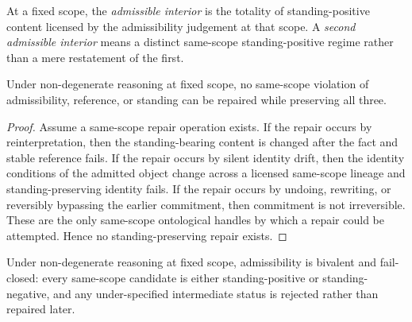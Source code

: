 \begin{definition}\label{def:admissible-interior}
At a fixed scope, the \emph{admissible interior} is the totality of standing-positive content licensed by the admissibility judgement at that scope. A \emph{second admissible interior} means a distinct same-scope standing-positive regime rather than a mere restatement of the first.
\end{definition}

\begin{lemma}\label{lem:no-standing-preserving-repair}
Under non-degenerate reasoning at fixed scope, no same-scope violation of admissibility, reference, or standing can be repaired while preserving all three.
\end{lemma}

\begin{proof}
Assume a same-scope repair operation exists. If the repair occurs by reinterpretation, then the standing-bearing content is changed after the fact and stable reference fails. If the repair occurs by silent identity drift, then the identity conditions of the admitted object change across a licensed same-scope lineage and standing-preserving identity fails. If the repair occurs by undoing, rewriting, or reversibly bypassing the earlier commitment, then commitment is not irreversible. These are the only same-scope ontological handles by which a repair could be attempted. Hence no standing-preserving repair exists.
\end{proof}

\begin{proposition}\label{prop:fixed-scope-bivalence}
Under non-degenerate reasoning at fixed scope, admissibility is bivalent and fail-closed: every same-scope candidate is either standing-positive or standing-negative, and any under-specified intermediate status is rejected rather than repaired later.
\end{proposition}

